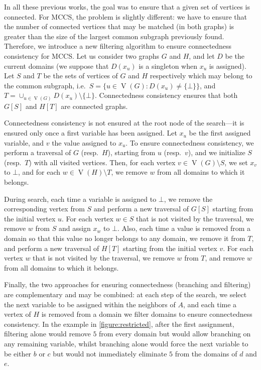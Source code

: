 \documentclass{llncs}
\begin{document}
In all these previous works, the goal was to ensure that a given set of vertices is connected. For
MCCS, the problem is slightly different: we have to ensure that the number of connected vertices
that may be matched (in both graphs) is greater than the size of the largest common subgraph
previously found. Therefore, we introduce a new filtering algorithm to ensure connectedness
consistency for MCCS.  Let us consider two graphs $G$ and $H$, and let $D$ be the current domains
(we suppose that $D(x_u)$ is a singleton when $x_u$ is assigned). Let $S$ and $T$ be the sets of
vertices of $G$ and $H$ respectively which may belong to the common subgraph, i.e.\ $S=\{ u\in
\operatorname{V}(G) : D(x_u)\neq\{\bot\}\}$, and $T = \cup_{u\in \operatorname{V}(G)} D(x_u)
\setminus \{ \bot \}$. Connectedness consistency ensures that both $G[S]$ and $H[T]$ are
connected graphs.

Connectedness consistency is not ensured at the root node of the search---it is ensured only once a
first variable has been assigned. Let $x_u$ be the first assigned variable, and $v$ the value
assigned to $x_u$. To ensure connectedness consistency, we perform a traversal of $G$ (resp.\ $H$),
starting from $u$ (resp.\ $v$), and we initialize $S$ (resp.\ $T$) with all visited vertices. Then,
for each vertex $v\in \operatorname{V}(G) \setminus S$, we set $x_v$ to $\bot$, and for each $w
\in \operatorname{V}(H) \setminus T$, we remove $w$ from all domains to which it belongs.

During search, each time a variable is assigned to $\bot$, we remove the corresponding vertex
from $S$ and perform a new traversal of $G[S]$ starting from the initial vertex $u$. For each vertex
$w\in S$ that is not visited by the traversal, we remove $w$ from $S$ and assign $x_w$ to $\bot$.
Also, each time a value is removed from a domain so that this value no longer belongs to any domain,
we remove it from $T$, and perform a new traversal of $H[T]$ starting from the initial vertex $v$.
For each vertex $w$ that is not visited by the traversal, we remove $w$ from $T$, and remove $w$
from all domains to which it belongs.

Finally, the two approaches for ensuring connectedness (branching and filtering) are complementary
and may be combined: at each step of the search, we select the next variable to be assigned within
the neighbors of $A$, and each time a vertex of $H$ is removed from a domain we filter domains to
ensure connectedness consistency. In the example in \cref{figure:restricted}, after the first
assignment, filtering alone would remove $5$ from every domain but would allow branching on any
remaining variable, whilst branching alone would force the next variable to be either $b$ or $c$ but
would not immediately eliminate $5$ from the domains of $d$ and $e$.
\end{document}
